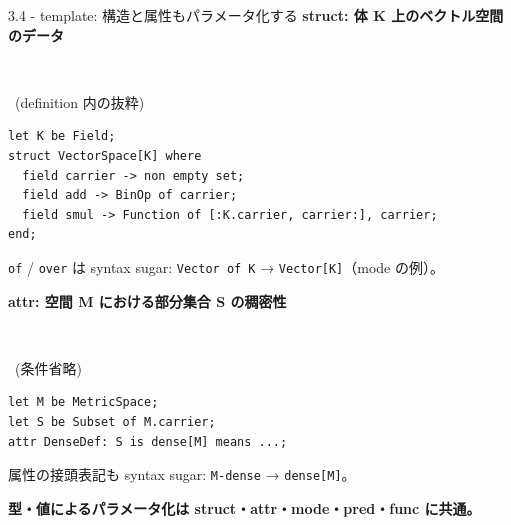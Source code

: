 \documentclass[dvipdfmx,aspectratio=169,11pt]{beamer}
\newcommand{\statusbadge}[2]{\colorbox{#1}{\textcolor{white}{\strut\scriptsize\sffamily\bfseries #2}}}
\newcommand{\badgeSketch}{\statusbadge{orange!75!black}{sketch}}
\begin{document}
\begin{frame}[fragile,t]{3.4 - template: 構造と属性もパラメータ化する}
\smallskip
\textbf{struct: 体 K 上のベクトル空間のデータ}~\badgeSketch~{\footnotesize(definition 内の抜粋)}
\begin{lstlisting}[language={mizar},basicstyle=\ttfamily\small]
let K be Field;
struct VectorSpace[K] where
  field carrier -> non empty set;
  field add -> BinOp of carrier;
  field smul -> Function of [:K.carrier, carrier:], carrier;
end;
\end{lstlisting}
\texttt{of} / \texttt{over} は syntax sugar: \texttt{Vector of K} → \texttt{Vector[K]}（mode の例）。

\smallskip
\textbf{attr: 空間 M における部分集合 S の稠密性}~\badgeSketch~{\footnotesize(条件省略)}
\begin{lstlisting}[language={mizar},basicstyle=\ttfamily\small]
let M be MetricSpace;
let S be Subset of M.carrier;
attr DenseDef: S is dense[M] means ...;
\end{lstlisting}
属性の接頭表記も syntax sugar: \texttt{M-dense} → \texttt{dense[M]}。

\textcolor{blue!55!black}{\textbf{型・値によるパラメータ化は struct・attr・mode・pred・func に共通。}}

\end{frame}
\end{document}
